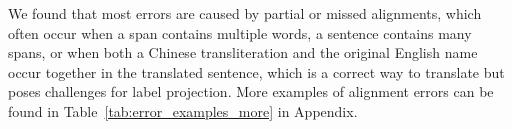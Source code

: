 \documentclass[11pt,dvipsnames]{article}
\begin{document}
We found that most errors are caused by partial or missed alignments, which often occur when a span contains multiple words, a sentence contains many spans, or when both a Chinese transliteration and the original English name occur together in the translated sentence, which is a correct way to translate but poses challenges for label projection. More examples of alignment errors can be found in Table~\ref{tab:error_examples_more} in Appendix.
\end{document}
